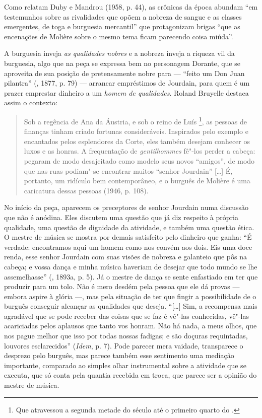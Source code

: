 Como relatam Duby e Mandrou (1958, p. 44), as crônicas da época abundam
``em testemunhos sobre as rivalidades que opõem a nobreza de sangue e as
classes emergentes, de toga e burguesia mercantil'' que protagonizam
brigas ``que as encenações de Molière sobre o mesmo tema ficam parecendo
coisa miúda''.

A burguesia inveja \emph{as qualidades nobres} e a nobreza inveja a
riqueza vil da burguesia, algo que na peça se expressa bem no personagem
Dorante, que se aproveita de sua posição de pretensamente nobre para ---
``feito um Don Juan pilantra'' (, 1877, p. 79) --- arrancar
empréstimos de Jourdain, para quem é um prazer emprestar dinheiro a um
\emph{homem de qualidades}. Roland Bruyelle destaca assim o contexto:

\begin{quote}
Sob a regência de Ana da Áustria, e sob o reino de Luís \footnote{Que
  atravessou a segunda metade do século  até o primeiro quarto do
  .}, as pessoas de finanças tinham criado fortunas consideráveis.
Inspirados pelo exemplo e encantados pelos esplendores da Corte, eles
também desejam conhecer os luxos e as honras. A frequentação de
\emph{gentilhommes} fê"-los perder a cabeça: pegaram de modo desajeitado
como modelo seus novos ``amigos'', de modo que nas ruas podiam"-se
encontrar muitos ``senhor Jourdain'' [\ldots{}] É, portanto, um
ridículo bem contemporâneo, e o burguês de Molière é uma caricatura dessas pessoas (1946, p. 108).
\end{quote}

No início da peça, aparecem os preceptores de senhor Jourdain numa
discussão que não é anódina. Eles discutem uma questão que já diz
respeito à própria qualidade, uma questão de dignidade da atividade, e
também uma questão ética. O mestre de música se mostra por demais
satisfeito pelo dinheiro que ganha: ``É verdade: encontramos aqui um
homem como nos convém aos dois. Eis uma doce renda, esse senhor Jourdain
com suas visões de nobreza e galanteio que pôs na cabeça; e vossa dança
e minha música haveriam de desejar que todo mundo se lhe assemelhasse''
(, 1893a, p. 5). Já o mestre de dança se sente enfastiado em ter
que produzir para um tolo. Não é mero desdém pela pessoa que ele dá
provas --- embora aspire à glória ---, mas pela situação de ter que fingir
a possibilidade de o burguês conseguir alcançar as qualidades que
deseja. ``[\ldots{}] Sim, a recompensa mais agradável que se pode receber
das coisas que se faz é vê"-las conhecidas, vê"-las acariciadas pelos
aplausos que tanto vos honram. Não há nada, a meus olhos, que nos pague
melhor que isso por todas nossas fadigas; e são doçuras requintadas,
louvores esclarecidos'' (\emph{Idem}, p. 7). Pode parecer mera vaidade,
transparece o desprezo pelo burguês, mas parece também esse sentimento
uma mediação importante, comparado ao simples olhar instrumental sobre a
atividade que se executa, que só conta pela quantia recebida em troca,
que parece ser a opinião do mestre de música.

